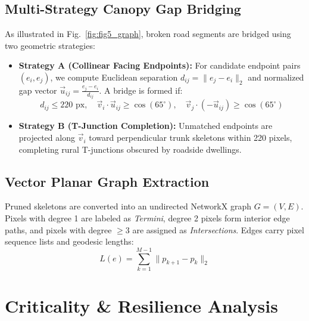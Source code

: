 \documentclass[conference]{IEEEtran}
\begin{document}
\subsection{Multi-Strategy Canopy Gap Bridging}
As illustrated in Fig.~\ref{fig:fig5_graph}, broken road segments are bridged using two geometric strategies:
\begin{itemize}
    \item \textbf{Strategy A (Collinear Facing Endpoints):} For candidate endpoint pairs $(e_i, e_j)$, we compute Euclidean separation $d_{ij} = \|e_j - e_i\|_2$ and normalized gap vector $\vec{u}_{ij} = \frac{e_j - e_i}{d_{ij}}$. A bridge is formed if:
    \begin{equation}
        d_{ij} \le 220\text{ px}, \quad \vec{v}_i \cdot \vec{u}_{ij} \ge \cos(65^\circ), \quad \vec{v}_j \cdot (-\vec{u}_{ij}) \ge \cos(65^\circ)
    \end{equation}
    \item \textbf{Strategy B (T-Junction Completion):} Unmatched endpoints are projected along $\vec{v}_i$ toward perpendicular trunk skeletons within 220 pixels, completing rural T-junctions obscured by roadside dwellings.
\end{itemize}

\subsection{Vector Planar Graph Extraction}
Pruned skeletons are converted into an undirected NetworkX graph $G = (V, E)$. Pixels with degree 1 are labeled as \textit{Termini}, degree 2 pixels form interior edge paths, and pixels with degree $\ge 3$ are assigned as \textit{Intersections}. Edges carry pixel sequence lists and geodesic lengths:
\begin{equation}
    L(e) = \sum_{k=1}^{M-1} \|p_{k+1} - p_k\|_2
\end{equation}

\section{Criticality \& Resilience Analysis}
\label{sec:resilience}
\end{document}

